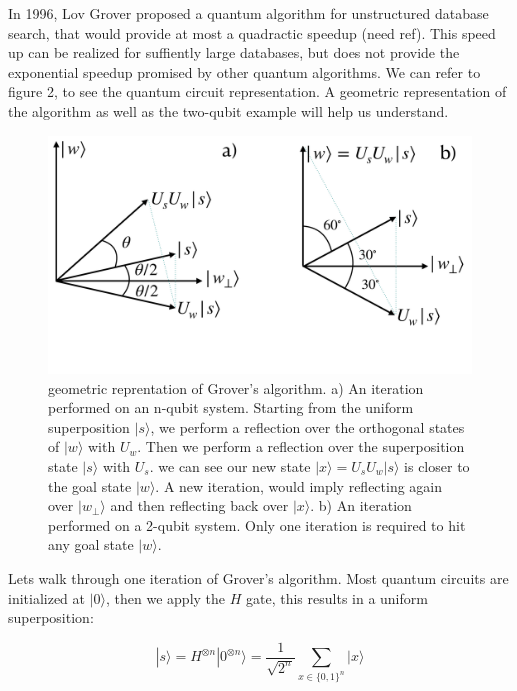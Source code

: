 \documentclass[twocolumn,showpacs,preprintnumbers,amsmath,amssymb]{revtex4}
\begin{document}
		In 1996, Lov Grover proposed a quantum algorithm for unstructured database search, that would provide at most a quadractic speedup (need ref). This speed up can be realized for suffiently large databases, but does not provide the exponential speedup promised by other quantum algorithms. We can refer to figure 2, to see the quantum circuit representation.
		A geometric representation of the algorithm as well as the two-qubit example will help us understand. 
		
		
		\begin{figure}[!h]
			\centering
			\includegraphics[trim={0 7.5cm 0 0},clip, width=0.99\linewidth]{"graphics/grov_geom"}
			\caption{geometric reprentation of Grover's algorithm.  a) An iteration performed on an n-qubit system.  Starting from the uniform superposition $|s\rangle$, we perform a reflection over the orthogonal states of $|w\rangle$ with $U_w$. Then we perform a reflection over the superposition state $|s\rangle$ with $U_s$. we can see our new state $|x\rangle = U_sU_w|s\rangle$ is closer to the goal state $|w\rangle$. A new iteration, would imply reflecting again over $|w_\perp\rangle$ and then reflecting back over $|x\rangle$. b) An iteration performed on a 2-qubit system. Only one iteration is required to hit any goal state $|w\rangle$. }
			\label{fig:grovergeometric}
		\end{figure}
		
		Lets walk through one iteration of Grover's algorithm. Most quantum circuits are initialized at $|0\rangle$, then we apply the $H$ gate, this results in a uniform superposition:
		
		\begin{equation}
		 |s\rangle = H^{\otimes n} |0^{\otimes n} \rangle = \frac{1}{\sqrt{2^n}} \sum_{x\in\{0,1\}^n} |x\rangle
		\end{equation}
		
\end{document}
